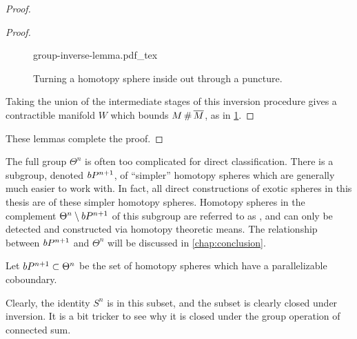\begin{proof}
\begin{proof}
		\begin{figure}[ht]
			\centering
			{group-inverse-lemma.pdf_tex}
			\caption{Turning a homotopy sphere inside out through a puncture.}\label{fig:group-inverse-lemma}
		\end{figure}

		\noindent
		Taking the union of the intermediate stages of this inversion procedure gives a contractible manifold $W$ which bounds $M\+\overline{M}$, as in \cref{fig:group-inverse-lemma}.
	\end{proof}

	\noindent
	These lemmas complete the proof.
\end{proof}


The full group $\Theta^n$ is often too complicated for direct classification. There is a subgroup, denoted $bP^{n+1}$, of ``simpler'' homotopy spheres which are generally much easier to work with. In fact, all direct constructions of exotic spheres in this thesis are of these simpler homotopy spheres. Homotopy spheres in the complement $\Theta^n\setminus bP^{n+1}$ of this subgroup are referred to as , and can only be detected and constructed via homotopy theoretic means. The relationship between $bP^{n+1}$ and $\Theta^n$ will be discussed in \cref{chap:conclusion}.

\begin{definition}
	Let $bP^{n+1}\subset \Theta^n$ be the set of homotopy spheres which have a parallelizable coboundary.
\end{definition}

Clearly, the identity $S^n$ is in this subset, and the subset is clearly closed under inversion. It is a bit tricker to see why it is closed under the group operation of connected sum. 

